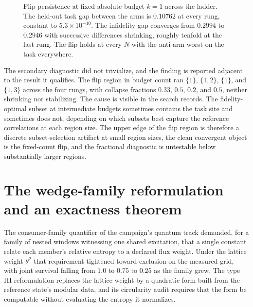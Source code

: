 \documentclass[aps,prd,reprint,nofootinbib,longbibliography]{revtex4-2}
\begin{document}
\begin{figure}[t]
\centering
{}
\caption{Flip persistence at fixed absolute budget $k=1$ across the
ladder.  The held-out task gap between the arms is $0.10762$ at every
rung, constant to $5.3\times 10^{-10}$.  The infidelity gap converges
from $0.2994$ to $0.2946$ with successive differences shrinking, roughly
tenfold at the last rung.  The flip holds at every $N$ with the anti-arm
worst on the task everywhere.}
\label{fig:flip}
\end{figure}

The secondary diagnostic did not trivialize, and the finding is reported
adjacent to the result it qualifies.  The flip region in budget count ran
$\{1\}$, $\{1,2\}$, $\{1\}$, and $\{1,3\}$ across the four rungs, with
collapse fractions $0.33$, $0.5$, $0.2$, and $0.5$, neither shrinking nor
stabilizing.  The cause is visible in the search records.  The
fidelity-optimal subset at intermediate budgets sometimes contains the
task site and sometimes does not, depending on which subsets best capture
the reference correlations at each region size.  The upper edge of the
flip region is therefore a discrete subset-selection artifact at small
region sizes, the clean convergent object is the fixed-count flip, and
the fractional diagnostic is untestable below substantially larger
regions.

\section{The wedge-family reformulation and an exactness theorem}
\label{sec:wedge}

The consumer-family quantifier of the campaign's quantum track
demanded, for a family of nested windows witnessing one shared
excitation, that a single constant relate each member's relative
entropy to a declared flux weight.  Under the lattice weight
$\theta^2$ that requirement tightened toward exclusion on the
measured grid, with joint survival falling from $1.0$ to $0.75$ to
$0.25$ as the family grew.  The type III reformulation replaces the
lattice weight by a quadratic form built from the reference state's
modular data, and its circularity audit requires that the form be
computable without evaluating the entropy it normalizes.
\end{document}
